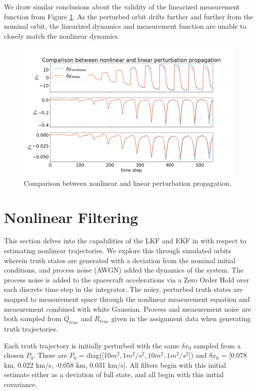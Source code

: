 \documentclass[11pt, a4paper]{article}
\begin{document}
We draw similar conclusions about the validity of the linearized measurement function from Figure \ref{fig:nlvl_m}.
As the perturbed orbit drifts further and further from the nominal orbit, the linearized dynamics and measurement function are unable to closely match the nonlinear dynamics. 
 

\begin{figure}[H]
	\centering
	\includegraphics[width=\textwidth]{./Figures/nonlvl_meas.png}
	\caption{Comparison between nonlinear and linear perturbation propagation.}
	\label{fig:nlvl_m}
\end{figure}


\section{Nonlinear Filtering}
This section delves into the capabilities of the LKF and EKF in with respect to estimating nonlinear trajectories. 
We explore this through simulated orbits wherein truth states are generated with a deviation from the nominal initial conditions, and process noise (AWGN) added the dynamics of the system. 
The process noise is added to the spacecraft accelerations via a Zero Order Hold over each discrete time step in the integrator. 
The noisy, perturbed truth states are mapped to measurement space through the nonlinear measurement equation and measurement combined with white Gaussian.
Process and measurement noise are both sampled from $Q_{true}$ and $R_{true}$ given in the assignment data when generating truth trajectories.

Each truth trajectory is initially perturbed with the same $\delta x_0$ sampled from a chosen $P_0$. These are $P_0$ = diag([$10m^2, 1m^2/s^2, 10m^2, 1m^2/s^2$]) and $\delta x_0$ = [0.078 km, 0.022 km/s, -0.058 km, 0.031 km/s].
All filters begin with this initial estimate either as a deviation of full state, and all begin with this initial covariance. 
\end{document}
